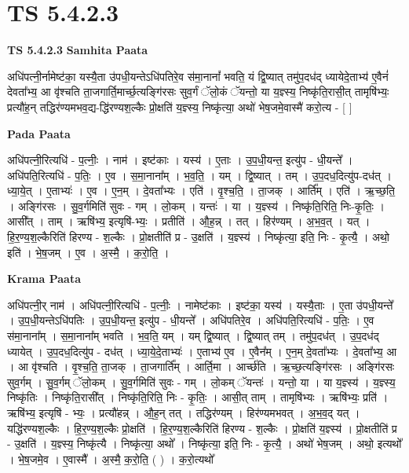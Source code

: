 \documentclass[17pt]{extarticle}
\begin{document}
\section{ TS 5.4.2.3 }

\textbf{TS 5.4.2.3 } \newline
\textbf{Samhita Paata} \newline

अधि॑पत्नी॒र्नामेष्ट॑का॒ यस्यै॒ता उ॑पधी॒यन्तेऽधि॑पतिरे॒व स॑मा॒नानां᳚ भवति॒ यं द्वि॒ष्यात् तमु॑प॒दध॑द् ध्यायेदे॒ताभ्य॑ ए॒वैनं॑ देवता᳚भ्य॒ आ वृ॑श्चति ता॒जगार्ति॒मार्च्छ॒त्यङ्गि॑रसः सुव॒र्गं ॅलो॒कं ॅयन्तो॒ या य॒ज्ञ्स्य॒ निष्कृ॑ति॒रासी॒त् तामृषि॑भ्यः॒ प्रत्यौ॑ह॒न् तद्धिर॑ण्यमभव॒द्य-द्धि॑रण्यश॒ल्कैः प्रो॒क्षति॑ य॒ज्ञ्स्य॒ निष्कृ॑त्या॒ अथो॑ भेष॒जमे॒वास्मै॑ करो॒त्य - [  ] \newline

\textbf{Pada Paata} \newline

अधि॑पत्नी॒रित्यधि॑ - प॒त्नीः॒ । नाम॑ । इष्ट॑काः । यस्य॑ । ए॒ताः । उ॒प॒धी॒यन्त॒ इत्यु॑प - धी॒यन्ते᳚ । अधि॑पति॒रित्यधि॑ - प॒तिः॒ । ए॒व । स॒मा॒नाना᳚म् । भ॒व॒ति॒ । यम् । द्वि॒ष्यात् । तम् । उ॒प॒दध॒दित्यु॑प-दध॑त् । ध्या॒ये॒त् । ए॒ताभ्यः॑ । ए॒व । ए॒न॒म् । दे॒वता᳚भ्यः । एति॑ । वृ॒श्च॒ति॒ । ता॒जक् । आर्ति᳚म् । एति॑ । ऋ॒च्छ॒ति॒ । अङ्गि॑रसः । सु॒व॒र्गमिति॑ सुवः - गम् । लो॒कम् । यन्तः॑ । या । य॒ज्ञ्स्य॑ । निष्कृ॑ति॒रिति॒ निः-कृ॒तिः॒ । आसी᳚त् । ताम् । ऋषि॑भ्य॒ इत्यृषि॑-भ्यः॒ । प्रतीति॑ । औ॒ह॒न्न् । तत् । हिर॑ण्यम् । अ॒भ॒व॒त् । यत् । हि॒र॒ण्य॒श॒ल्कैरिति॑ हिरण्य - श॒ल्कैः । प्रो॒क्षतीति॑ प्र - उ॒क्षति॑ । य॒ज्ञ्स्य॑ । निष्कृ॑त्या॒ इति॒ निः - कृ॒त्यै॒ । अथो॒ इति॑ । भे॒ष॒जम् । ए॒व । अ॒स्मै॒ । क॒रो॒ति॒ ।  \newline


\textbf{Krama Paata} \newline

अधि॑पत्नी॒र् नाम॑ । अधि॑पत्नी॒रित्यधि॑ - प॒त्नीः॒ । नामेष्ट॑काः । इष्ट॑का॒ यस्य॑ । यस्यै॒ताः । ए॒ता उ॑पधी॒यन्ते᳚ । उ॒प॒धी॒यन्तेऽधि॑पतिः । उ॒प॒धी॒यन्त॒ इत्यु॑प - धी॒यन्ते᳚ । अधि॑पतिरे॒व । अधि॑पति॒रित्यधि॑ - प॒तिः॒ । ए॒व स॑मा॒नाना᳚म् । स॒मा॒नाना᳚म् भवति । भ॒व॒ति॒ यम् । यम् द्वि॒ष्यात् । द्वि॒ष्यात् तम् । तमु॑प॒दध॑त् । उ॒प॒दध॑द् ध्यायेत् । उ॒प॒दध॒दित्यु॑प - दध॑त् । ध्या॒ये॒दे॒ताभ्यः॑ । ए॒ताभ्य॑ ए॒व । ए॒वैन᳚म् । ए॒न॒म् दे॒वता᳚भ्यः । दे॒वता᳚भ्य॒ आ । आ वृ॑श्चति । वृ॒श्च॒ति॒ ता॒जक् । ता॒जगार्ति᳚म् । 
आर्ति॒मा । आर्च्छ॑ति । ऋ॒च्छ॒त्यङ्गि॑रसः । अङ्गि॑रसः सुव॒र्गम् । सु॒व॒र्गम् ॅलो॒कम् । सु॒व॒र्गमिति॑ सुवः - गम् । लो॒कम् ॅयन्तः॑ । यन्तो॒ या । या य॒ज्ञ्स्य॑ । य॒ज्ञ्स्य॒ निष्कृ॑तिः । निष्कृ॑ति॒रासी᳚त् । निष्कृ॑ति॒रिति॒ निः - कृ॒तिः॒ । आसी॒त् ताम् । तामृषि॑भ्यः । ऋषि॑भ्यः॒ प्रति॑ । ऋषि॑भ्य॒ इत्यृषि॑ - भ्यः॒ । प्रत्यौ॑हन्न् । औ॒ह॒न् तत् । तद्धिर॑ण्यम् । हिर॑ण्यमभवत् । अ॒भ॒व॒द् यत् । यद्धि॑रण्यश॒ल्कैः । हि॒र॒ण्य॒श॒ल्कैः प्रो॒क्षति॑ । हि॒र॒ण्य॒श॒ल्कैरिति॑ हिरण्य - श॒ल्कैः । प्रो॒क्षति॑ य॒ज्ञ्स्य॑ । प्रो॒क्षतीति॑ प्र - उ॒क्षति॑ । य॒ज्ञ्स्य॒ निष्कृ॑त्यै । निष्कृ॑त्या॒ अथो᳚ । निष्कृ॑त्या॒ इति॒ निः - कृ॒त्यै॒ । 
अथो॑ भेष॒जम् । अथो॒ इत्यथो᳚ । भे॒ष॒जमे॒व । ए॒वास्मै᳚ । 
अ॒स्मै॒ क॒रो॒ति॒ ( ) । क॒रो॒त्यथो᳚ \newline
\end{document}
